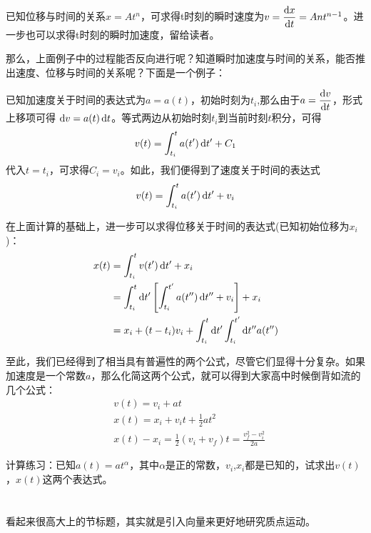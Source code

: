 \subsection[质点运动学有关的计算]{}
\eg 已知位移与时间的关系$x=At^{n} $，可求得t时刻的瞬时速度为$v=\dfrac{\dif  x}{\dif  t} =Ant^{n-1} $。进一步也可以求得t时刻的瞬时加速度，留给读者。

那么，上面例子中的过程能否反向进行呢？知道瞬时加速度与时间的关系，能否推出速度、位移与时间的关系呢？下面是一个例子：

已知加速度关于时间的表达式为$a=a(t)$，初始时刻为$t_{i} $,那么由于$a=\dfrac{\dif  v}{\dif  t}$，形式上移项可得 $\dif  v=a(t)\dif  t$。等式两边从初始时刻$t_{i}$到当前时刻$t$积分，可得
\[v(t)=\int_{t_{i}}^{t}a(t') \dif  t'+C_{1}\]
代入$t=t_{i}$，可求得$C_{i}=v_{i}$。如此，我们便得到了速度关于时间的表达式
\[v(t)=\int_{t_{i}}^{t}a(t')\dif  t'+v_{i}\]

在上面计算的基础上，进一步可以求得位移关于时间的表达式(已知初始位移为$x_{i}$)：
\begin{equation}
    \begin{aligned}
    x(t)&=\int_{t_{i}}^{t}v(t')\dif  t'+x_{i}\\
    & =\int_{t_{i}}^{t} \dif  t'\left[\int_{t_{i}}^{t'}a(t'')\dif  t''+v_{i}\right]+x_{i}\\
    & =x_{i}+(t-t_{i})v_{i}+\int_{t_{i}}^{t}\dif  t'\int_{t_{i}}^{t'}\dif  t''a(t'')  
     \end{aligned}
    \nonumber
\end{equation}

至此，我们已经得到了相当具有普遍性的两个公式，尽管它们显得十分复杂。如果加速度是一个常数$a$，那么化简这两个公式，就可以得到大家高中时候倒背如流的几个公式：
\begin{equation}
    \begin{aligned}
    &v(t)=v_{i}+at\\
    &x(t)=x_{i}+v_{i}t+\frac{1}{2}at^{2}\\
    &x(t)-x_{i}= \frac{1}{2} (v_{i}+v_{f})t=\frac{v_{f}^{2}-v_{i}^{2}}{2a} 
    \end{aligned}
    \nonumber
\end{equation}

计算练习：已知$a(t)=at^{\alpha }$，其中$\alpha$是正的常数，$v_{i}$,$x_{i}$都是已知的，试求出$v(t)$，$x(t)$这两个表达式。
\section[高维的质点运动]{}
看起来很高大上的节标题，其实就是引入向量来更好地研究质点运动。

